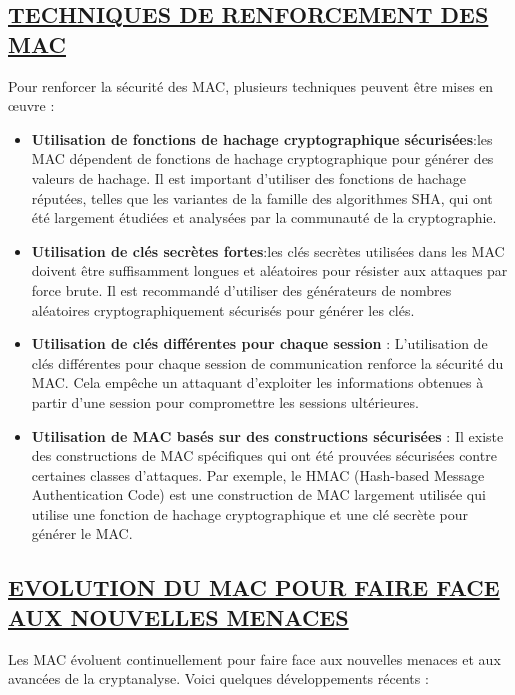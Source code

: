 \subsection{\textbf{\underline{TECHNIQUES DE RENFORCEMENT DES MAC}}}

Pour renforcer la sécurité des MAC, plusieurs techniques peuvent être mises en œuvre :

\begin{itemize}[label=$\cdot$]
    \item \textbf{Utilisation de fonctions de hachage cryptographique sécurisées}:les MAC dépendent de fonctions de hachage cryptographique pour générer des valeurs de hachage. Il est important d'utiliser des fonctions de hachage réputées, telles que les variantes de la famille des algorithmes SHA, qui ont été largement étudiées et analysées par la communauté de la cryptographie.
    \item \textbf{Utilisation de clés secrètes fortes}:les clés secrètes utilisées dans les MAC doivent être suffisamment longues et aléatoires pour résister aux attaques par force brute. Il est recommandé d'utiliser des générateurs de nombres aléatoires cryptographiquement sécurisés pour générer les clés.
    \item \textbf{Utilisation de clés différentes pour chaque session} : L'utilisation de clés différentes pour chaque session de communication renforce la sécurité du MAC. Cela empêche un attaquant d'exploiter les informations obtenues à partir d'une session pour compromettre les sessions ultérieures.
    \item \textbf{Utilisation de MAC basés sur des constructions sécurisées} : Il existe des constructions de MAC spécifiques qui ont été prouvées sécurisées contre certaines classes d'attaques. Par exemple, le HMAC (Hash-based Message Authentication Code) est une construction de MAC largement utilisée qui utilise une fonction de hachage cryptographique et une clé secrète pour générer le MAC.
\end{itemize}

\subsection{\textbf{\underline{EVOLUTION DU MAC POUR FAIRE FACE AUX NOUVELLES MENACES}}}

Les MAC évoluent continuellement pour faire face aux nouvelles menaces et aux avancées de la cryptanalyse. Voici quelques développements récents :

